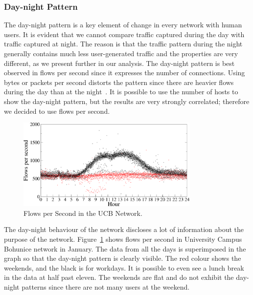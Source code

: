 \subsubsection{Day-night Pattern}

The day-night pattern is a key element of change in every network with human users. It is evident that we cannot compare traffic captured during the day with traffic captured at night. The reason is that the traffic pattern during the night generally contains much less user-generated traffic and the properties are very different, as we present further in our analysis. The day-night pattern is best observed in flows per second since it expresses the number of connections. Using bytes or packets per second distorts the pattern since there are heavier flows during the day than at the night~\cite{Quan-2010-Characteristics}. It is possible to use the number of hosts to show the day-night pattern, but the results are very strongly correlated; therefore we decided to use flows per second.

\begin{figure}[!t]
        \begin{center}
                \includegraphics[width=0.8\textwidth]{figures/paper-characterization/flows-ukb-jan}
                \caption{Flows per Second in the UCB Network.}
                \label{fig:characterization-flows-ukb-jan}
        \end{center}
\end{figure}

The day-night behaviour of the network discloses a lot of information about the purpose of the network. Figure~\ref{fig:characterization-flows-ukb-jan} shows flows per second in University Campus Bohunice network in January. The data from all the days is superimposed in the graph so that the day-night pattern is clearly visible. The red colour shows the weekends, and the black is for workdays. It is possible to even see a lunch break in the data at half past eleven. The weekends are flat and do not exhibit the day-night patterns since there are not many users at the weekend.

